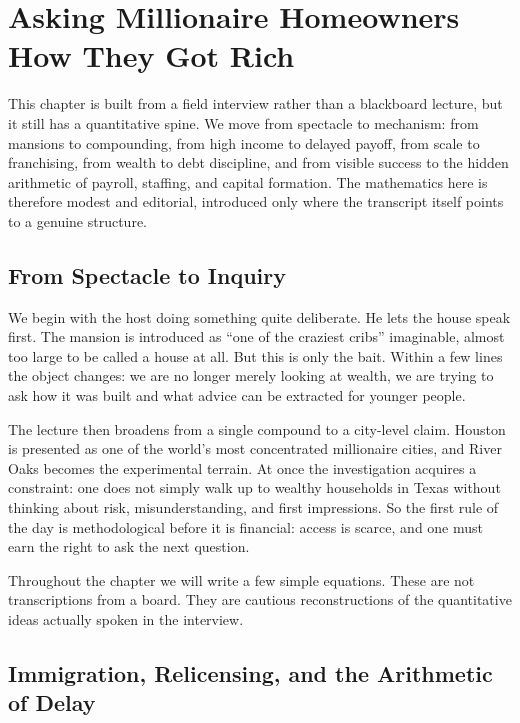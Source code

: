 \chapter{Asking Millionaire Homeowners How They Got Rich}

This chapter is built from a field interview rather than a blackboard lecture, but it still has a quantitative spine. We move from spectacle to mechanism: from mansions to compounding, from high income to delayed payoff, from scale to franchising, from wealth to debt discipline, and from visible success to the hidden arithmetic of payroll, staffing, and capital formation. The mathematics here is therefore modest and editorial, introduced only where the transcript itself points to a genuine structure.

\section{From Spectacle to Inquiry}

We begin with the host doing something quite deliberate. He lets the house speak first. The mansion is introduced as ``one of the craziest cribs'' imaginable, almost too large to be called a house at all. But this is only the bait. Within a few lines the object changes: we are no longer merely looking at wealth, we are trying to ask how it was built and what advice can be extracted for younger people.

The lecture then broadens from a single compound to a city-level claim. Houston is presented as one of the world's most concentrated millionaire cities, and River Oaks becomes the experimental terrain. At once the investigation acquires a constraint: one does not simply walk up to wealthy households in Texas without thinking about risk, misunderstanding, and first impressions. So the first rule of the day is methodological before it is financial: access is scarce, and one must earn the right to ask the next question.

\begin{remark}
Throughout the chapter we will write a few simple equations. These are not transcriptions from a board. They are cautious reconstructions of the quantitative ideas actually spoken in the interview.
\end{remark}

\section{Immigration, Relicensing, and the Arithmetic of Delay}


